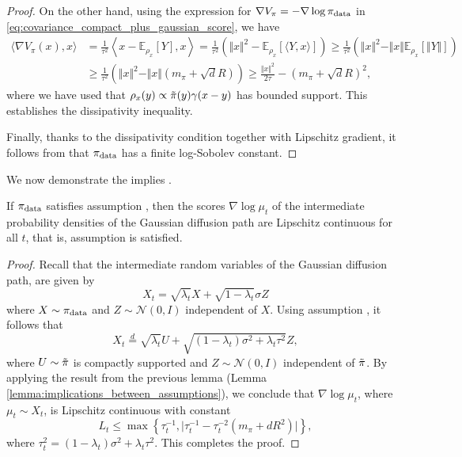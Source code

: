 \begin{proof}
On the other hand, using the expression for $\nabla V_\pi = -\nabla\log\operatorname*{\pi_{\text{data}}}$ in \eqref{eq:covariance_compact_plus_gaussian_score}, we have 
\begin{align*}
    \langle\nabla V_\pi(x), x\rangle &= \frac{1}{\tau^2}\left\langle x- \mathbb{E}_{\rho_x}[Y], x\right\rangle = \frac{1}{\tau^2}\left(\Vert x\Vert^2-\mathbb{E}_{\rho_x}[\langle Y, x\rangle]\right)\geq \frac{1}{\tau^2}\left(\Vert x\Vert^2-\Vert x\Vert\mathbb{E}_{\rho_x}[\Vert Y\Vert]\right)\\
    &\geq \frac{1}{\tau^2}\left(\Vert x\Vert^2-\Vert x\Vert(m_\pi + \sqrt{d}R)\right) \geq \frac{\Vert x\Vert^2}{2\tau} -(m_\pi + \sqrt{d}R)^2,
\end{align*}
where we have used that $\rho_x(y) \propto \Tilde{\pi}(y)\gamma(x-y)$ has bounded support. This establishes the dissipativity inequality.

Finally, thanks to the dissipativity condition together with Lipschitz gradient, it follows from \citet{cattiaux2010note} that $\operatorname*{\pi_{\text{data}}}$ has a finite log-Sobolev constant.
\end{proof}

We now demonstrate the  implies .
\begin{lemma}
    If $\operatorname*{\pi_{\text{data}}}$ satisfies assumption , then the scores $\nabla\log\mu_t$ of the intermediate probability densities of the Gaussian diffusion path are Lipschitz continuous for all $t$, that is, assumption  is satisfied.
\end{lemma}
\begin{proof}
    Recall that the intermediate random variables of the Gaussian diffusion path, are given by
    \begin{equation*}
        X_t = \sqrt{\lambda_t} X + \sqrt{1-\lambda_t} \sigma Z
    \end{equation*}
    where $X\sim\operatorname*{\pi_{\text{data}}}$ and $Z\sim\mathcal{N}(0, I)$ independent of $X$. Using assumption , it follows that 
    \begin{equation*}
        X_t \overset{d}{=} \sqrt{\lambda_t} U + \sqrt{(1-\lambda_t)\sigma^2 + \lambda_t\tau^2} Z,
    \end{equation*}
    where $U\sim\Tilde{\pi}$ is compactly supported and $Z\sim\mathcal{N}(0, I)$ independent of $\Tilde{\pi}$. 
    By applying the result from the previous lemma (Lemma \ref{lemma:implications_between_assumptions}), we conclude that $\nabla\log\mu_t$, where $\mu_t\sim X_t$, is Lipschitz continuous with constant
    \begin{equation*}
        L_t \leq \max\left\lbrace \tau_t^{-1}, \vert\tau_t^{-1}-\tau_t^{-2} (m_\pi + dR^2)\vert \right\rbrace,
    \end{equation*}
    where $\tau_t^2 = (1-\lambda_t)\sigma^2 + \lambda_t\tau^2$. This completes the proof.
\end{proof}


